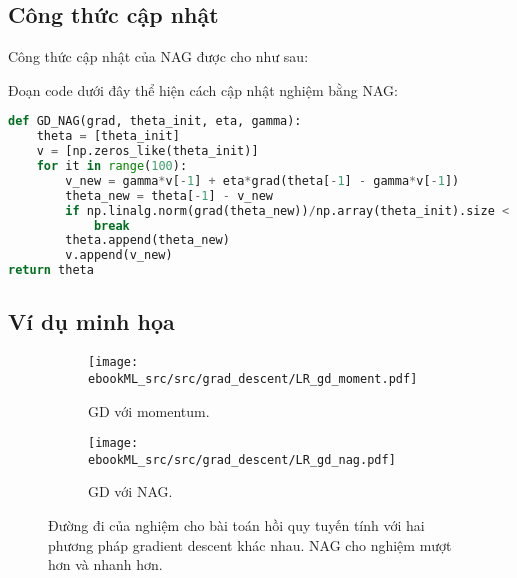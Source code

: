 
\subsection{Công thức cập nhật}

Công thức cập nhật của NAG được cho như sau:





Đoạn code dưới đây thể hiện cách cập nhật nghiệm bằng NAG:
\begin{lstlisting}[language=Python]
def GD_NAG(grad, theta_init, eta, gamma):
    theta = [theta_init]
    v = [np.zeros_like(theta_init)]
    for it in range(100):
        v_new = gamma*v[-1] + eta*grad(theta[-1] - gamma*v[-1])
        theta_new = theta[-1] - v_new
        if np.linalg.norm(grad(theta_new))/np.array(theta_init).size < 1e-3:
            break
        theta.append(theta_new)
        v.append(v_new)
return theta
\end{lstlisting}

\subsection{Ví dụ minh họa }

\begin{figure}[t]
\begin{subfigure}{0.49\textwidth}
\texttt{[image: ebookML\_src/src/grad\_descent/LR\_gd\_moment.pdf]}
\caption{GD với momentum.}
\label{fig:8_momentnaga}
\end{subfigure}
\begin{subfigure}{0.49\textwidth}
\texttt{[image: ebookML\_src/src/grad\_descent/LR\_gd\_nag.pdf]}
\caption{GD với NAG.}
\label{fig:8_momentnagb}
\end{subfigure}
\caption{
Đường đi của nghiệm cho bài toán hồi quy tuyến tính với hai phương pháp
gradient descent khác nhau. NAG cho nghiệm mượt hơn và nhanh hơn.
}
\label{fig:8_momentnag}
\end{figure}


